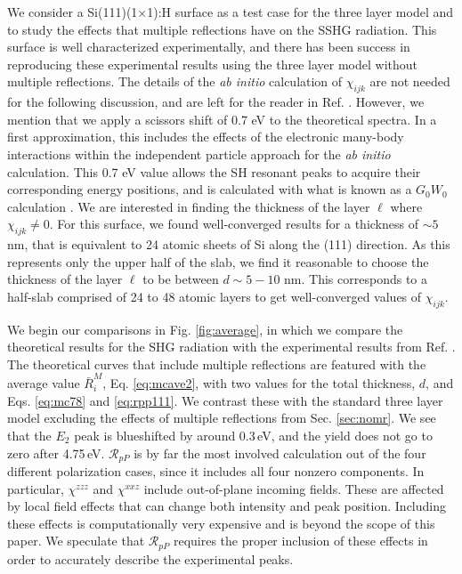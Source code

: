 We consider a Si(111)(1$\times$1):H surface as a test case for the three layer model and to study the effects that multiple reflections have on the SSHG radiation. This surface is well characterized experimentally,\cite{mitchellSS01, mejiaPRB02, bergfeldPRL04} and there has been success in reproducing these experimental results using the three layer model without multiple reflections.\cite{andersonPRB16} The details of the \emph{ab initio} calculation of $\chi_{ijk}$ are not needed for the following discussion, and are left for the reader in Ref. \cite{andersonPRB16}. However, we mention that we apply a scissors shift of 0.7 eV to the theoretical spectra. In a first approximation, this includes the effects of the electronic many-body interactions within the independent particle approach for the \emph{ab initio} calculation. This 0.7 eV value allows the SH resonant peaks to acquire their corresponding energy positions, and is calculated with what is known as a $G_{0}W_{0}$ calculation \cite{andersonPRB16}. We are interested in finding the thickness of the layer $\ell$ where $\chi_{ijk} \ne 0$. For this surface, we found well-converged results for a thickness of $\sim 5$ nm, that is equivalent to 24 atomic sheets of Si along the (111) direction. As this represents only the upper half of the slab, we find it reasonable to choose the thickness of the layer $\ell$ to be between $d\sim 5-10$ nm. This corresponds to a half-slab comprised of 24 to 48 atomic layers to get well-converged values of $\chi_{ijk}$.

We begin our comparisons in Fig. \ref{fig:average}, in which we compare the theoretical results for the SHG radiation with the experimental results from Ref. \cite{mejiaPRB02}. The theoretical curves that include multiple reflections are featured with the average value $\bar{R}^{M}_{i}$, Eq. \eqref{eq:mcave2}, with two values for the total thickness, $d$, and Eqs. \eqref{eq:mc78} and \eqref{eq:rpp111}. We contrast these with the standard three layer model excluding the effects of multiple reflections from Sec. \ref{sec:nomr}. We see that the $E_{2}$ peak is blueshifted by around 0.3\,eV, and the yield does not go to zero after 4.75\,eV. $\mathcal{R}_{pP}$ is by far the most involved calculation out of the four different polarization cases, since it includes all four nonzero components. In particular, $\chi^{zzz}$ and $\chi^{xxz}$ include out-of-plane incoming fields. These are affected by local field effects that can change both intensity and peak position.\cite{tancognedejean:tel-01235611} Including these effects is computationally very expensive and is beyond the scope of this paper. We speculate that $\mathcal{R}_{pP}$ requires the proper inclusion of these effects in order to accurately describe the experimental peaks.

